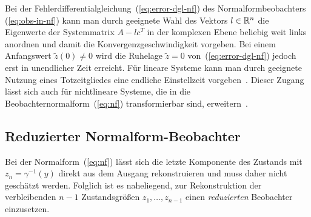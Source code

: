 \begin{remark}
\label{rem:endliche-Einstellzeit}Bei der Fehlerdifferentialgleichung~(\ref{eq:error-dgl-nf})
des Normalformbeobachters~ (\ref{eq:obs-in-nf}) kann man durch geeignete
Wahl des Vektors $l\in{\mathbb{R}}^{n}$ die Eigenwerte der Systemmatrix $A-lc^{T}$
in der komplexen Ebene beliebig weit links anordnen und damit die
Konvergenzgeschwindigkeit vorgeben. Bei einem Anfangswert $\tilde{z}(0)\neq0$
wird die Ruhelage $\tilde{z}=0$ von~(\ref{eq:error-dgl-nf}) jedoch
erst in unendlicher Zeit erreicht. Für lineare Systeme kann man durch
geeignete Nutzung eines Totzeitgliedes eine endliche Einstellzeit
vorgeben~\cite{engel2002}. Dieser Zugang lässt sich auch für nichtlineare
Systeme, die in die Beobachternormalform~(\ref{eq:nf}) transformierbar
sind, erweitern~\cite{menold2003cdc}.
\end{remark}

\subsection{Reduzierter Normalform-Beobachter}

Bei der Normalform~(\ref{eq:nf}) lässt sich die letzte Komponente
des Zustands mit $z_{n}=\gamma^{-1}(y)$ direkt aus dem Ausgang rekonstruieren
und muss daher nicht geschätzt werden. Folglich ist es naheliegend,
zur Rekonstruktion der verbleibenden $n-1$ Zustandsgrößen $z_{1},\ldots,z_{n-1}$
einen \emph{reduzierten} Beobachter
einzusetzen. 

